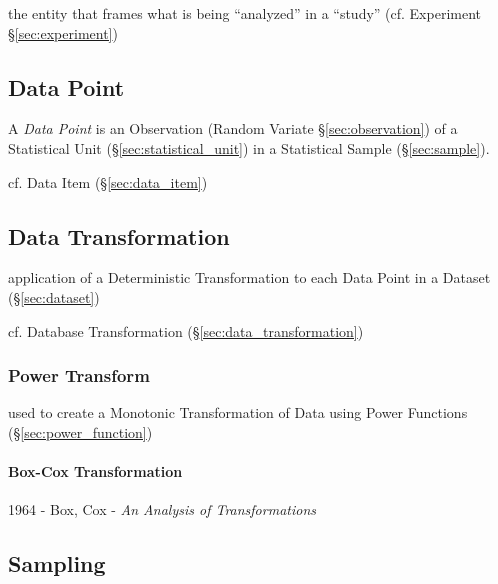 the entity that frames what is being ``analyzed'' in a ``study'' (cf. Experiment
\S\ref{sec:experiment})



\subsection{Data Point}\label{sec:data_point}

A \emph{Data Point} is an Observation (Random Variate \S\ref{sec:observation})
of a Statistical Unit (\S\ref{sec:statistical_unit}) in a Statistical Sample
(\S\ref{sec:sample}).

cf. Data Item (\S\ref{sec:data_item})



\subsection{Data Transformation}\label{sec:dataset_transformation}

application of a Deterministic Transformation to each Data Point in a Dataset
(\S\ref{sec:dataset})

\fist cf. Database Transformation (\S\ref{sec:data_transformation})



\subsubsection{Power Transform}\label{sec:power_transform}

used to create a Monotonic Transformation of Data using Power Functions
(\S\ref{sec:power_function})



\paragraph{Box-Cox Transformation}\label{sec:boxcox_transformation}\hfill

1964 - Box, Cox - \emph{An Analysis of Transformations}



\subsection{Sampling}\label{sec:sampling}

